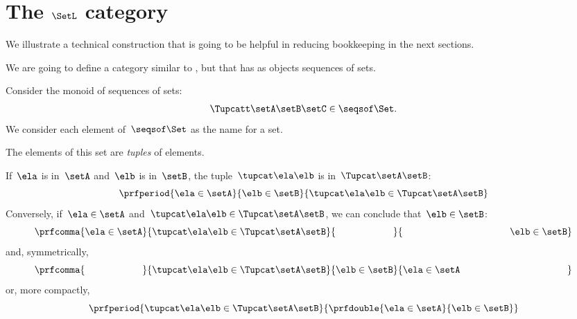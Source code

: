 

\section{The $\SetL$ category}
\label{sec:SetL}

We illustrate a technical construction that is going to be helpful in reducing bookkeeping in the next sections.

We are going to define a category similar to \Set, but that has as objects sequences of sets.

Consider the monoid of sequences of sets:
%
\begin{equation}
    \label{eq:sets-monoid}
    \Tupcatt \setA  \setB  \setC \in \seqsof\Set.
\end{equation}
%
We consider each element of~$\seqsof\Set$ as the name for a set.

The elements of this set are \emph{tuples} of elements.

If~$\ela$ is in~$\setA$ and~$\elb$ is in~$\setB$, the tuple~$\tupcat \ela \elb$ is in~$\Tupcat \setA \setB$:
%
\begin{equation}
    \label{eq:sets-monoid-axiom1}
    \prfperiod{
        \ela \in \setA
    }{
        \elb \in \setB
    }{
        \tupcat \ela \elb \in \Tupcat \setA \setB
    }
\end{equation}
%
Conversely, if~$\ela \in \setA$ and~$\tupcat \ela \elb \in \Tupcat \setA \setB$, we can conclude that~$\elb \in \setB$:
%
\begin{equation}
    \label{eq:sets-monoid-axiom2}
    \prfcomma{
        \ela \in \setA
    }{
        \tupcat \ela \elb \in \Tupcat \setA  \setB
    }{
        \phantom{\elb \in \setB}
    }{
        \rule{39mm}{0pt} \elb \in  \setB
    }
\end{equation}
%
and, symmetrically,
%
\begin{equation}
    \label{eq:sets-monoid-axiom3}
    \prfcomma{
        \phantom{\ela \in \setA}
    }{
        \tupcat \ela \elb \in \Tupcat \setA \setB
    }{
        \elb \in \setB
    }{
        \ela \in  \setA \rule{39mm}{0pt}
    }
\end{equation}
%
or, more compactly,
%
\begin{equation}
    \label{eq:sets-monoid-axiom3bis}
    \prfperiod{
        \tupcat \ela \elb \in \Tupcat \setA \setB
    }{
        \prfdouble{
            \ela \in \setA
        }{
            \elb \in \setB
        }
    }
\end{equation}
%

